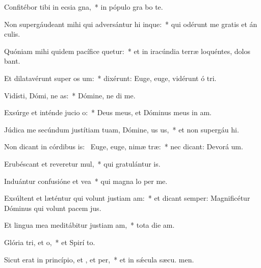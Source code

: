 \item Confitébor tibi in ecsia gna,~* in pópulo gra bo te.
\item Non supergáudeant mihi qui adversántur hi inque:~* qui odérunt me gratis et án culis.
\item Quóniam mihi quidem pacífice quetur:~* et in iracúndia terræ loquéntes, dolos bant.
\item Et dilatavérunt super  os um:~* dixérunt: Euge, euge, vidérunt ó tri.
\item Vidísti, Dómi, ne as:~* Dómine, ne di  me.
\item Exsúrge et inténde jucio o:~* Deus meus, et Dóminus meus in  am.
\item Júdica me secúndum justítiam tuam, Dómine, us us,~* et non supergáu hi.
\item Non dicant in córdibus is:~\pscross{} Euge, euge, nimæ træ:~* nec dicant: Devorá um.
\item Erubéscant et reveretur mul,~* qui gratulántur  is.
\item Induántur confusióne et vea~* qui magna lo per me.
\item Exsúltent et læténtur qui volunt justiam am:~* et dicant semper: Magnificétur Dóminus qui volunt pacem  jus.
\item Et lingua mea meditábitur justiam am,~* tota die  am.
\item Glória tri, et o,~* et Spirí to.
\item Sicut erat in princípio, et , et per,~* et in sǽcula sæcu. men.
